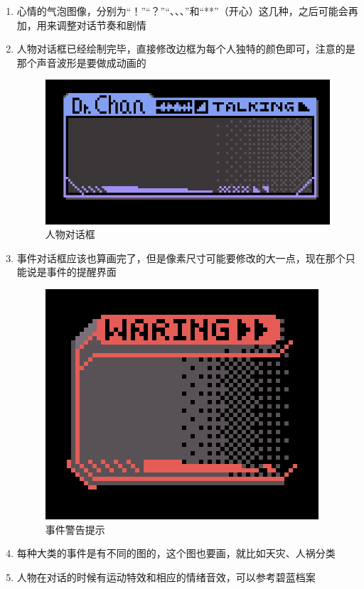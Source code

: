 \documentclass{ctexart}
\begin{document}
\begin{enumerate}
				\item 心情的气泡图像，分别为“！”“？”“、、、”和“**”（开心）这几种，之后可能会再加，用来调整对话节奏和剧情
				\item 人物对话框已经绘制完毕，直接修改边框为每个人独特的颜色即可，注意的是那个声音波形是要做成动画的 
				\begin{figure}[H]
				\centering
				\includegraphics[scale=0.4]{material/hud3.png}
				\caption{人物对话框}
				\label{人物对话框}
				\end{figure}
				\item 事件对话框应该也算画完了，但是像素尺寸可能要修改的大一点，现在那个只能说是事件的提醒界面
				\begin{figure}[H]
				\centering
				\includegraphics[scale=0.4]{material/hud2.png}
				\caption{事件警告提示}
				\label{事件警告提示}
				\end{figure}

				\item 每种大类的事件是有不同的图的，这个图也要画，就比如天灾、人祸分类
				\item 人物在对话的时候有运动特效和相应的情绪音效，可以参考碧蓝档案
			\end{enumerate}
\end{document}
